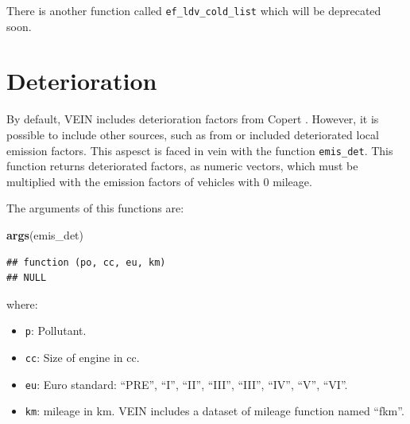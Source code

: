 \documentclass[12pt,graybox,envcountchap,sectrefs]{krantz}
\makeatletter
\newenvironment{Shaded}{\begin{snugshade}}{\end{snugshade}}
\newcommand{\KeywordTok}[1]{\textcolor[rgb]{0.13,0.29,0.53}{\textbf{#1}}}
\newcommand{\NormalTok}[1]{#1}
\providecommand{\tightlist}{%
  \setlength{\itemsep}{0pt}\setlength{\parskip}{0pt}}
\newenvironment{kframe}{%
\medskip{}
\setlength{\fboxsep}{.8em}
 \def\at@end@of@kframe{}%
 \ifinner\ifhmode%
  \def\at@end@of@kframe{\end{minipage}}%
  \begin{minipage}{\columnwidth}%
 \fi\fi%
 \def\FrameCommand##1{\hskip\@totalleftmargin \hskip-\fboxsep
 \colorbox{shadecolor}{##1}\hskip-\fboxsep
     \hskip-\linewidth \hskip-\@totalleftmargin \hskip\columnwidth}%
 \MakeFramed {\advance\hsize-\width
   \@totalleftmargin\z@ \linewidth\hsize
   \@setminipage}}%
 {\par\unskip\endMakeFramed%
 \at@end@of@kframe}
\renewenvironment{Shaded}{\begin{kframe}}{\end{kframe}}
\theoremstyle{definition}
\theoremstyle{definition}
\theoremstyle{definition}
\theoremstyle{remark}
\makeatother
\begin{document}
There is another function called \texttt{ef\_ldv\_cold\_list} which will
be deprecated soon.

\section{Deterioration}\label{det}

By default, VEIN includes deterioration factors from Copert
\citep{NtziachristosSamaras2016}. However, it is possible to include
other sources, such as from \citep{CorvalanVargas2003} or included
deteriorated local emission factors. This aspesct is faced in vein with
the function \texttt{emis\_det}. This function returns deteriorated
factors, as numeric vectors, which must be multiplied with the emission
factors of vehicles with 0 mileage.

The arguments of this functions are:

\begin{Shaded}
\begin{Highlighting}[]
\KeywordTok{args}\NormalTok{(emis_det)}
\end{Highlighting}
\end{Shaded}

\begin{verbatim}
## function (po, cc, eu, km) 
## NULL
\end{verbatim}

where:

\begin{itemize}
\tightlist
\item
  \texttt{p}: Pollutant.
\item
  \texttt{cc}: Size of engine in cc.
\item
  \texttt{eu}: Euro standard: ``PRE'', ``I'', ``II'', ``III'', ``III'',
  ``IV'', ``V'', ``VI''.
\item
  \texttt{km}: mileage in km. VEIN includes a dataset of mileage
  function named ``fkm''.
\end{itemize}
\end{document}
